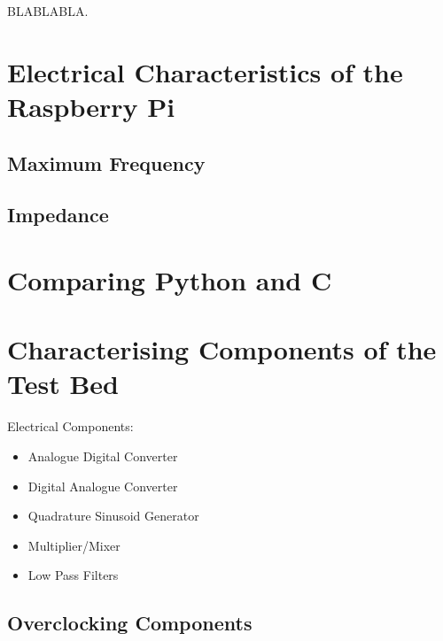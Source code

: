 \documentclass[../main.tex]{subfiles}
\begin{document}
BLABLABLA.


\section{Electrical Characteristics of the Raspberry Pi}
\subsection{Maximum Frequency}
\subsection{Impedance}


\section{Comparing Python and C} \label{sec_Comparing Python and C}


\section{Characterising Components of the Test Bed} \label{sec_Components}

Electrical Components:
\begin{itemize}
	\item Analogue Digital Converter
	\item Digital Analogue Converter
	\item Quadrature Sinusoid Generator
	\item Multiplier/Mixer
	\item Low Pass Filters
\end{itemize}

\subsection{Overclocking Components}
\end{document}
